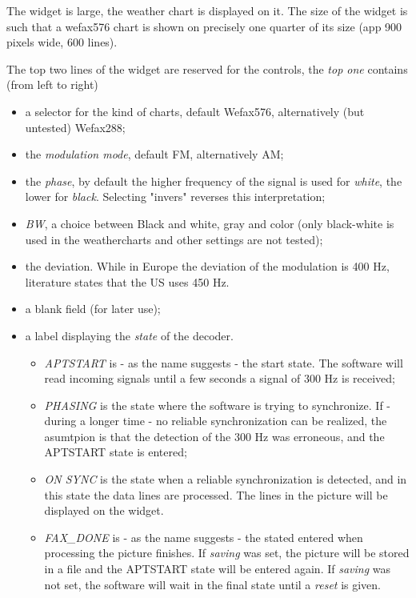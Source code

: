 \documentclass[11pt]{article}
\begin{document}
The widget is large, the weather chart is displayed
on it. The size of the widget is such that a wefax576 chart is shown
on precisely one quarter of its size (app 900 pixels wide, 600 lines).
\par
The top two lines of the widget are reserved for the controls,
the {\em top one} contains (from left to right)
\begin{itemize}
\item a selector for the kind of charts, default Wefax576, alternatively
(but untested) Wefax288;
\item the {\em modulation mode}, default FM, alternatively AM;
\item the {\em phase}, by default the higher frequency of the signal
is used for {\em white}, the lower for {\em black}.
Selecting "invers" reverses this interpretation;
\item {\em BW}, a choice between Black and white, gray and color
(only black-white is used in the weathercharts and other settings are not
tested);
\item the {deviation}. While in Europe the deviation of the modulation is
400 Hz, literature states that the US uses 450 Hz.
\item a blank field (for later use);
\item a label displaying the {\em state} of the decoder. 
\begin{itemize}
\item {\em APTSTART} is - as the name suggests - the start state. The software
will read incoming signals until a few seconds a signal of 300 Hz
is received;
\item {\em PHASING} is the state where the software is trying to synchronize.
If - during a longer time - no reliable synchronization can be realized, the
asumtpion is that the detection of the 300 Hz was erroneous, and the APTSTART
state is entered;
\item {\em ON SYNC} is the state when a reliable synchronization is detected,
and in this state the data lines are processed.
The lines in the picture will be displayed on the widget.
\item {\em FAX\_DONE} is - as the name suggests - the stated entered when
processing the picture finishes. If {\em saving} was set, the picture
will be stored in a file and the APTSTART state will be entered again.
If {\em saving} was not set, the software will wait in the final state
until a {\em reset} is given.
\end{itemize}
\end{itemize}
\end{document}
